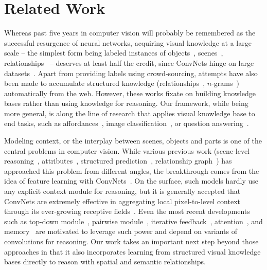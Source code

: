 \documentclass[10pt,twocolumn,letterpaper]{article}
\begin{document}
\section{Related Work}
\vspace{-0.05in}
 Whereas past five years in computer vision will probably be remembered as the successful resurgence of neural networks, acquiring visual knowledge at a large scale -- the simplest form being labeled instances of objects~\cite{russakovsky2015imagenet,lin2014microsoft}, scenes~\cite{zhou2016semantic}, relationships~\cite{krishna2016visual} \etc -- deserves at least half the credit, since ConvNets hinge on large datasets~\cite{chensun2017}. Apart from providing labels using crowd-sourcing, attempts have also been made to accumulate structured knowledge (\eg relationships~\cite{chen2013neil}, $n$-grams~\cite{divvala2014learning}) automatically from the web. However, these works fixate on building knowledge bases rather than using knowledge for reasoning. Our framework, while being more general, is along the line of research that applies visual knowledge base to end tasks, such as affordances~\cite{zhu2015building}, image classification~\cite{marino2016more}, or question answering~\cite{wu2016ask}.

 Modeling context, or the interplay between scenes, objects and parts is one of the central problems in computer vision. While various previous work (\eg scene-level reasoning~\cite{torralba2003context}, attributes~\cite{farhadi2009describing,parikh2011relative}, structured prediction~\cite{krahenbuhl2011efficient,desai2011discriminative,tu2010auto}, relationship graph~\cite{johnson2015image,lu2016visual,xu2017scene}) has approached this problem from different angles, the breakthrough comes from the idea of feature learning with ConvNets~\cite{he2016deep}. On the surface, such models hardly use any explicit context module for reasoning, but it is generally accepted that ConvNets are extremely effective in aggregating local pixel-to-level context through its ever-growing receptive fields~\cite{zeiler2014visualizing}. Even the most recent developments such as top-down module~\cite{xie2016top,lin2016feature,tdm_cvpr17}, pairwise module~\cite{santoro2017simple}, iterative feedback~\cite{wei2016convolutional,newell2016stacked,carreira2016human}, attention~\cite{yang2016stacked}, and memory~\cite{xiong2016dynamic,chen2017spatial} are motivated to leverage such power and depend on variants of convolutions for reasoning. Our work takes an important next step beyond those approaches in that it also incorporates learning from structured visual knowledge bases directly to reason with spatial and semantic relationships.
\end{document}
